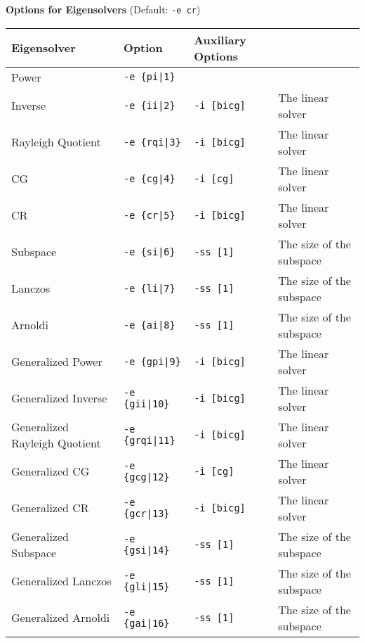 \documentclass[a4paper]{article}
\begin{document}
\begin{minipage}[t]{\textwidth}
\begin{center}
{\bf Options for Eigensolvers} (Default: \verb=-e cr=) \\
\begin{tabular}{l|lll}\hline\hline
 Eigensolver      & Option              &  Auxiliary Options  & \\ \hline
\hline
 Power                             & \verb=-e {pi|1}=        &    \\ 
 Inverse                           & \verb=-e {ii|2}=        &
 \verb=-i [bicg]= & The linear solver \\
 Rayleigh Quotient                 & \verb=-e {rqi|3}=       &
 \verb=-i [bicg]= & The linear solver \\
 CG                                & \verb=-e {cg|4}=        &
 \verb=-i [cg]= & The linear solver \\ 
 CR                                & \verb=-e {cr|5}=        &
 \verb=-i [bicg]= & The linear solver \\ 
 Subspace                          & \verb=-e {si|6}=        &
 \verb=-ss [1]= & The size of the subspace \\
 Lanczos                           & \verb=-e {li|7}=        &
 \verb=-ss [1]= & The size of the subspace \\
 Arnoldi                           & \verb=-e {ai|8}=        &
 \verb=-ss [1]= & The size of the subspace \\
 Generalized Power                 & \verb=-e {gpi|9}=      &
 \verb=-i [bicg]= & The linear solver \\ 
 Generalized Inverse               & \verb=-e {gii|10}=      & 
 \verb=-i [bicg]= & The linear solver \\
 Generalized Rayleigh Quotient     & \verb=-e {grqi|11}=      & 
 \verb=-i [bicg]= & The linear solver \\ 
 Generalized CG                    & \verb=-e {gcg|12}=      & 
 \verb=-i [cg]= & The linear solver \\
 Generalized CR                    & \verb=-e {gcr|13}=      & 
 \verb=-i [bicg]= & The linear solver \\
 Generalized Subspace              & \verb=-e {gsi|14}=      &
 \verb=-ss [1]= & The size of the subspace \\
 Generalized Lanczos               & \verb=-e {gli|15}=      &
 \verb=-ss [1]= & The size of the subspace \\
 Generalized Arnoldi               & \verb=-e {gai|16}=      &
 \verb=-ss [1]= & The size of the subspace \\  
\hline         
\end{tabular}
\end{center}
\end{minipage}
\end{document}
